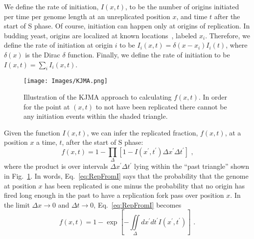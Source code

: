 		We define the rate of initiation, $I(x,t)$, to be the number of origins initiated per time per genome length at an unreplicated position $x$, and time $t$ after the start of S phase.
		Of course, initiation can happen only at origins of replication.
		In budding yeast, origins are localized at known locations~\cite{OriDB}, labeled $x_i$.
		Therefore, we define the rate of initiation at origin $i$ to be $I_i(x,t)=\delta(x-x_i)I_i(t)$, where $\delta(x)$ is the Dirac $\delta$ function.
		Finally, we define the rate of initiation to be $I(x,t) = \sum\limits_i I_i(x,t)$.
		
		\begin{figure}[tbh]
			\begin{center}
				\texttt{[image: Images/KJMA.png]}
			\end{center}
				\caption[Replicated fraction from KJMA]{\label{fig:KJMA} Illustration of the KJMA approach to calculating $f(x,t)$.
					In order for the point at $(x,t)$ to not have been replicated there cannot be any initiation events within the shaded triangle.
				}
		\end{figure}
		
		Given the function $I(x,t)$, we can infer the replicated fraction, $f(x,t)$, at a position $x$ a time, $t$, after the start of S phase:
		\begin{equation} \label{eq:RepFromI}
			f\left( x,t\right) = 1 - \prod_\Delta\left[1-I\left( x^\prime,t^\prime\right)\Delta x^\prime\Delta t^\prime\right] \text{ ,}
		\end{equation}
		where the product is over intervals $\Delta x^\prime \Delta t^\prime$ lying within the ``past triangle'' shown in Fig.~\ref{fig:KJMA}.
		In words, Eq.~\ref{eq:RepFromI} says that the probability that the genome at position $x$ has been replicated is one minus the probability that no origin has fired long enough in the past to have a replication fork pass over position $x$.
		In the limit $\Delta x\rightarrow0$ and $\Delta t\rightarrow0$, Eq.~\ref{eq:RepFromI} becomes
		\begin{equation} \label{eq:RepFromIexp}
			f\left( x,t\right) = 1 - \exp\left[-\iint\limits_\Delta dx^\prime dt^\prime I\left( x^\prime,t^\prime\right)\right] \text{ .}
		\end{equation}
		
